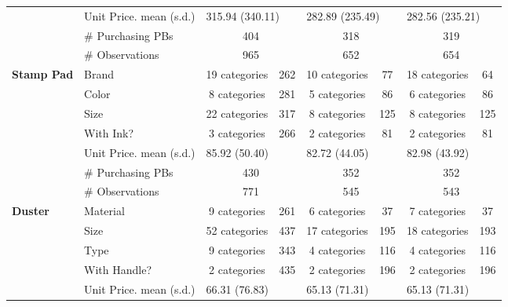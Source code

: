 \begin{longtable}{llccccccccc}
 \cmidrule{2-11} 
 & Unit Price. mean (s.d.) & \multicolumn{3}{l}{315.94 (340.11)} & \multicolumn{3}{l}{282.89 (235.49)} & \multicolumn{3}{l}{282.56 (235.21)} \\* 
 & \# Purchasing PBs & \multicolumn{3}{c}{404} & \multicolumn{3}{c}{318} & \multicolumn{3}{c}{319} \\* 
 & \# Observations & \multicolumn{3}{c}{965} & \multicolumn{3}{c}{652} & \multicolumn{3}{c}{654} \\* 
 \midrule 
 \multirow{7}{*}{\textbf{Stamp Pad}} & Brand & \multicolumn{2}{c}{19 categories} & 262 & \multicolumn{2}{c}{10 categories} & 77 & \multicolumn{2}{c}{18 categories} & 64 \\* 
 & Color & \multicolumn{2}{c}{8 categories} & 281 & \multicolumn{2}{c}{5 categories} & 86 & \multicolumn{2}{c}{6 categories} & 86 \\* 
 & Size & \multicolumn{2}{c}{22 categories} & 317 & \multicolumn{2}{c}{8 categories} & 125 & \multicolumn{2}{c}{8 categories} & 125 \\* 
 & With Ink? & \multicolumn{2}{c}{3 categories} & 266 & \multicolumn{2}{c}{2 categories} & 81 & \multicolumn{2}{c}{2 categories} & 81 \\* 
 \cmidrule{2-11} 
 & Unit Price. mean (s.d.) & \multicolumn{3}{l}{85.92 (50.40)} & \multicolumn{3}{l}{82.72 (44.05)} & \multicolumn{3}{l}{82.98 (43.92)} \\* 
 & \# Purchasing PBs & \multicolumn{3}{c}{430} & \multicolumn{3}{c}{352} & \multicolumn{3}{c}{352} \\* 
 & \# Observations & \multicolumn{3}{c}{771} & \multicolumn{3}{c}{545} & \multicolumn{3}{c}{543} \\* 
 \midrule 
 \multirow{7}{*}{\textbf{Duster}} & Material & \multicolumn{2}{c}{9 categories} & 261 & \multicolumn{2}{c}{6 categories} & 37 & \multicolumn{2}{c}{7 categories} & 37 \\* 
 & Size & \multicolumn{2}{c}{52 categories} & 437 & \multicolumn{2}{c}{17 categories} & 195 & \multicolumn{2}{c}{18 categories} & 193 \\* 
 & Type & \multicolumn{2}{c}{9 categories} & 343 & \multicolumn{2}{c}{4 categories} & 116 & \multicolumn{2}{c}{4 categories} & 116 \\* 
 & With Handle? & \multicolumn{2}{c}{2 categories} & 435 & \multicolumn{2}{c}{2 categories} & 196 & \multicolumn{2}{c}{2 categories} & 196 \\* 
 \cmidrule{2-11} 
 & Unit Price. mean (s.d.) & \multicolumn{3}{l}{66.31 (76.83)} & \multicolumn{3}{l}{65.13 (71.31)} & \multicolumn{3}{l}{65.13 (71.31)} \\* 

\end{longtable}
